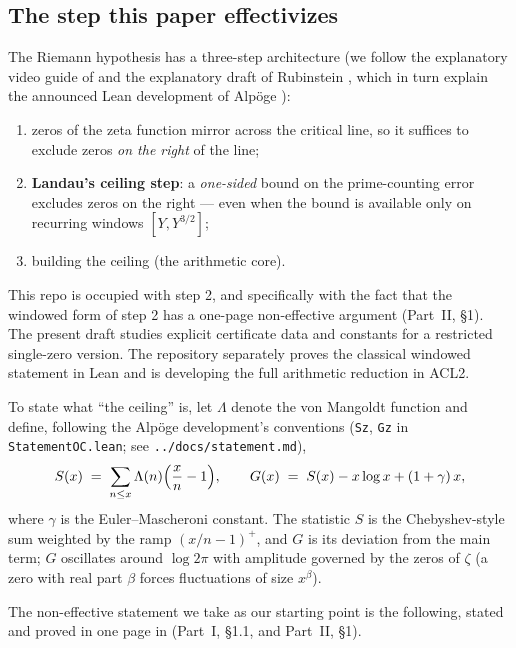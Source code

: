 \documentclass[11pt]{amsart}
\numberwithin{equation}{section}
\newcommand{\Lam}{\Lambda}
\newcommand{\Euler}{\gamma}
\begin{document}
\subsection{The step this paper effectivizes}

The Riemann hypothesis has a three-step architecture (we follow the
explanatory video guide of \cite{RieVideo} and the explanatory draft of
Rubinstein \cite{Rub26}, which in turn explain the announced Lean
development of Alp\"oge \cite{Alp26}):

\begin{enumerate}
\item zeros of the zeta function mirror across the critical line, so it
suffices to exclude zeros \emph{on the right} of the line;
\item \textbf{Landau's ceiling step}: a \emph{one-sided} bound on the
prime-counting error excludes zeros on the right --- even when the bound is
available only on recurring windows $[Y, Y^{3/2}]$;
\item building the ceiling (the arithmetic core).
\end{enumerate}

This repo is occupied with step 2, and specifically with the fact that
the windowed form of step 2 has a one-page non-effective argument
\cite{Rub26} (Part~II, \S1). The present draft studies explicit certificate
data and constants for a restricted single-zero version. The repository
separately proves the classical windowed statement in Lean and is developing
the full arithmetic reduction in ACL2.

To state what ``the ceiling'' is, let $\Lam$ denote the von Mangoldt
function and define, following the Alp\"oge development's conventions
(\texttt{Sz}, \texttt{Gz} in \texttt{StatementOC.lean}; see
\texttt{../docs/statement.md}),
\begin{equation}\label{eq:SG}
S(x) \;=\; \sum_{n \le x} \Lam(n)\Bigl(\frac{x}{n} - 1\Bigr),
\qquad
G(x) \;=\; S(x) - x\log x + (1+\Euler)\,x,
\end{equation}
where $\Euler$ is the Euler--Mascheroni constant. The statistic $S$ is the
Chebyshev-style sum weighted by the ramp $(x/n-1)^+$, and $G$ is its
deviation from the main term; $G$ oscillates around $\log 2\pi$ with
amplitude governed by the zeros of $\zeta$ (a zero with real part $\beta$
forces fluctuations of size $x^{\beta}$).

The non-effective statement we take as our starting point is the
following, stated and proved in one page in \cite{Rub26} (Part~I, \S1.1, and
Part~II, \S1).
\end{document}
